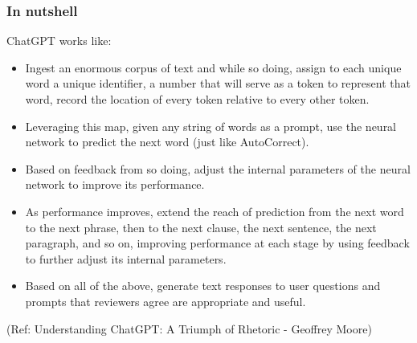 \begin{frame}[fragile]\frametitle{In nutshell}

ChatGPT works like:
\begin{itemize}
\item Ingest an enormous corpus of text and while so doing, assign to each unique word a unique identifier, a number that will serve as a token to represent that word, record the location of every token relative to every other token.
\item Leveraging this map, given any string of words as a prompt, use the neural network to predict the next word (just like AutoCorrect).
\item Based on feedback from so doing, adjust the internal parameters of the neural network to improve its performance.
\item As performance improves, extend the reach of prediction from the next word to the next phrase, then to the next clause, the next sentence, the next paragraph, and so on, improving performance at each stage by using feedback to further adjust its internal parameters.
\item Based on all of the above, generate text responses to user questions and prompts that reviewers agree are appropriate and useful.
\end{itemize}


{\tiny (Ref: Understanding ChatGPT: A Triumph of Rhetoric - Geoffrey Moore)}

\end{frame}

